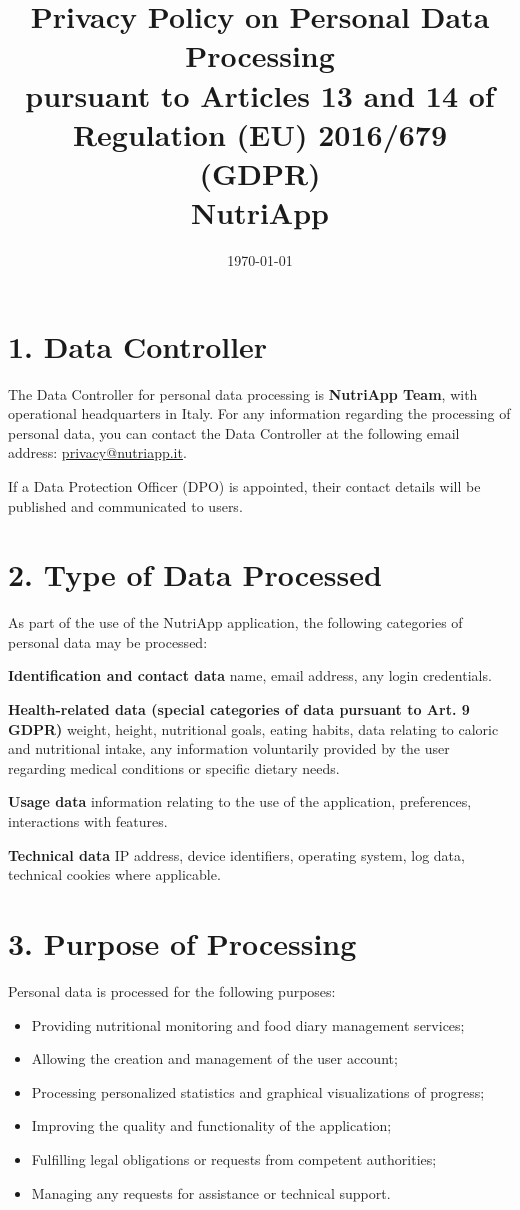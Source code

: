 \documentclass[a4paper,12pt]{article}
\title{\textbf{Privacy Policy on Personal Data Processing}\\
pursuant to Articles 13 and 14 of Regulation (EU) 2016/679 (GDPR)\\
NutriApp}
\date{\today}
\begin{document}
    \maketitle

    \section*{1. Data Controller}

    The Data Controller for personal data processing is \textbf{NutriApp Team}, with operational headquarters in Italy.
    For any information regarding the processing of personal data, you can contact the Data Controller at the following email address:
    \href{mailto:privacy@nutriapp.it}{privacy@nutriapp.it}.

    If a Data Protection Officer (DPO) is appointed, their contact details will be published and communicated to users.

    \section*{2. Type of Data Processed}

    As part of the use of the NutriApp application, the following categories of personal data may be processed:

    \textbf{Identification and contact data}
    name, email address, any login credentials.

    \textbf{Health-related data (special categories of data pursuant to Art. 9 GDPR)}
    weight, height, nutritional goals, eating habits, data relating to caloric and nutritional intake, any information voluntarily provided by the user regarding medical conditions or specific dietary needs.

    \textbf{Usage data}
    information relating to the use of the application, preferences, interactions with features.

    \textbf{Technical data}
    IP address, device identifiers, operating system, log data, technical cookies where applicable.

    \section*{3. Purpose of Processing}

    Personal data is processed for the following purposes:

    \begin{itemize}
        \item Providing nutritional monitoring and food diary management services;
        \item Allowing the creation and management of the user account;
        \item Processing personalized statistics and graphical visualizations of progress;
        \item Improving the quality and functionality of the application;
        \item Fulfilling legal obligations or requests from competent authorities;
        \item Managing any requests for assistance or technical support.
    \end{itemize}
\end{document}
